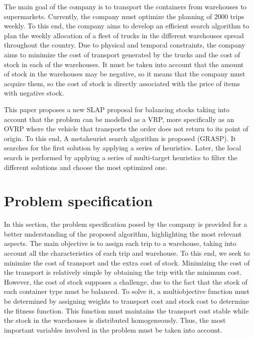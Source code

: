 \documentclass[letterpaper]{article} %
\begin{document}
The main goal of the company is to transport the containers from warehouses to supermarkets. Currently, the company must optimize the planning of 2000 trips weekly. To this end, the company aims to develop an efficient search algorithm to plan the weekly allocation of a fleet of trucks in the different warehouses spread throughout the country. Due to physical and temporal constraints, the company aims to minimize the cost of transport generated by the trucks and the cost of stock in each of the warehouses. It must be taken into account that the amount of stock in the warehouses may be negative, so it means that the company must acquire them, so the cost of stock is directly associated with the price of items with negative stock.

This paper proposes a new SLAP proposal for balancing stocks taking into account that the problem can be modelled as a VRP, more specifically as an OVRP where the vehicle that transports the order does not return to its point of origin. To this end, A metaheurist search algorithm is proposed (GRASP). It searches for the first solution by applying a series of heuristics. Later, the local search is performed by applying a series of multi-target heuristics to filter the different solutions and choose the most optimized one.

\section*{Problem specification}

In this section, the problem specification posed by the company is provided for a better understanding of the proposed algorithm, highlighting the most relevant aspects. The main objective is to assign each trip to a warehouse, taking into account all the characteristics of each trip and warehouse. To this end, we seek to minimize the cost of transport and the extra cost of stock.  Minimizing the cost of the transport is relatively simple by obtaining the trip with the minimum cost. However, the cost of stock supposes a challenge, due to the fact that the stock of each container type must be balanced. To solve it, a multiobjective function must be determined by assigning weights to transport cost and stock cost to determine the fitness function. This function must maintains the transport cost stable while the stock in the warehouses is distributed homogeneously. Thus, the most important variables involved in the problem must be taken into account.
\end{document}
